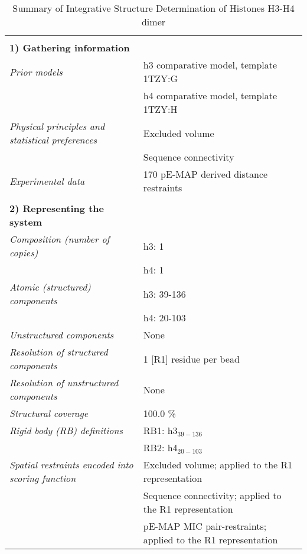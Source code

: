 \documentclass[8pt,a4paper]{article}
\begin{document}
\begin{longtable}{ p{} | p{} } 
\caption{Summary of Integrative Structure Determination of Histones H3-H4 dimer}
  
  &  \\
  \textbf{1) Gathering information} & \\
    \hline

            \textit{Prior models} & h3 comparative model, template 1TZY:G\\
            & h4 comparative model, template 1TZY:H \\
                \textit{Physical principles and statistical preferences} & Excluded volume\\
            & Sequence connectivity \\
                \textit{Experimental data} & 170 pE-MAP derived distance restraints\\
          
    &  \\
    \normalsize{\textbf{2) Representing the system}} & \\
    \hline
    
            \textit{Composition (number of copies)} & h3: 1\\
            & h4: 1 \\
                \textit{Atomic (structured) components} & h3: 39-136\\
            & h4: 20-103 \\
                \textit{Unstructured components} & None\\
                \textit{Resolution of structured components} & 1 [R1] residue per bead\\
                \textit{Resolution of unstructured components} & None\\
                \textit{Structural coverage} & 100.0 \%\\
                \textit{Rigid body (RB) definitions} & RB1: h3$_{39-136}$\\
            & RB2: h4$_{20-103}$ \\
                \textit{Spatial restraints encoded into scoring function} & Excluded volume; applied to the R1 representation\\
            & Sequence connectivity; applied to the R1 representation \\
            & pE-MAP MIC pair-restraints; applied to the R1 representation \\
          



\end{longtable}
\end{document}
